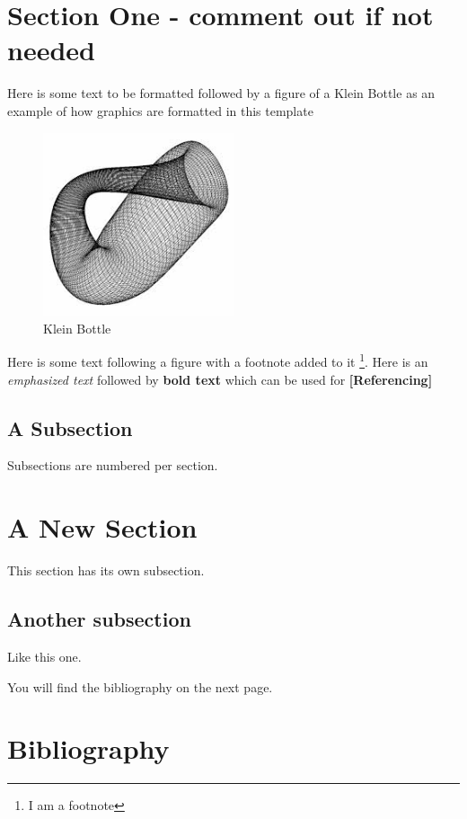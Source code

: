 \documentclass{SMR}
\begin{document}
\section{Section One - comment out if not needed} %
\vspace*{1.0cm}

Here is some text to be formatted followed by a figure of
a Klein Bottle as an example of how graphics are formatted
in this template   

\begin{figure}[h]
\caption{Klein Bottle} %
\centering
\includegraphics[width=0.5\textwidth]{klein.jpg}
\end{figure}

Here is some text following a figure with a footnote added
to it \footnote{I am a footnote}. Here is an \emph{emphasized text}
followed by \textbf{bold text} which can be used for
\textbf{[Referencing]}

\pagebreak

\subsection{A Subsection} %

Subsections are numbered per section.

\section{A New Section}

This section has its own subsection.

\subsection{Another subsection}

Like this one.

You will find the bibliography on the next page.
\vfill\pagebreak


\section*{Bibliography}
\end{document}
